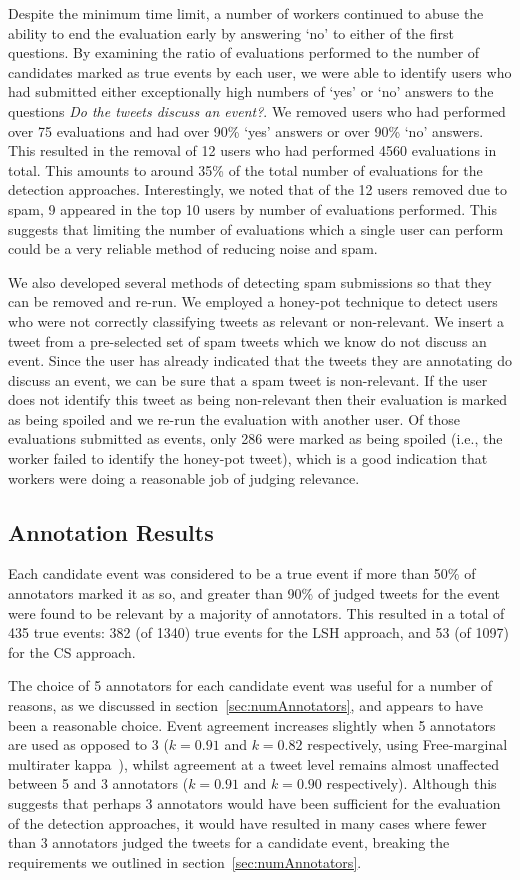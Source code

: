 Despite the minimum time limit, a number of workers continued to abuse the ability to end the evaluation early by answering `no' to either of the first questions.
By examining the ratio of evaluations performed to the number of candidates marked as true events by each user, we were able to identify users who had submitted either exceptionally high numbers of `yes' or `no' answers to the questions \emph{Do the tweets discuss an event?}.
We removed users who had performed over 75 evaluations and had over 90\% `yes' answers or over 90\% `no' answers.
This resulted in the removal of 12 users who had performed 4560 evaluations in total.
This amounts to around 35\% of the total number of evaluations for the detection approaches.
Interestingly, we noted that of the 12 users removed due to spam, 9 appeared in the top 10 users by number of evaluations performed.
This suggests that limiting the number of evaluations which a single user can perform could be a very reliable method of reducing noise and spam.

We also developed several methods of detecting spam submissions so that they can be removed and re-run.
We employed a honey-pot technique to detect users who were not correctly classifying tweets as relevant or non-relevant.
We insert a tweet from a pre-selected set of spam tweets which we know do not discuss an event.
Since the user has already indicated that the tweets they are annotating do discuss an event, we can be sure that a spam tweet is non-relevant.
If the user does not identify this tweet as being non-relevant then their evaluation is marked as being spoiled and we re-run the evaluation with another user.
Of those evaluations submitted as events, only 286 were marked as being spoiled (i.e., the worker failed to identify the honey-pot tweet), which is a good indication that workers were doing a reasonable job of judging relevance.

\subsection{Annotation Results}
Each candidate event was considered to be a true event if more than 50\% of annotators marked it as so, and greater than 90\% of judged tweets for the event were found to be relevant by a majority of annotators.
This resulted in a total of 435 true events: 382 (of 1340) true events for the LSH approach, and 53 (of 1097) for the CS approach.

The choice of 5 annotators for each candidate event was useful for a number of reasons, as we discussed in section~\ref{sec:numAnnotators}, and appears to have been a reasonable choice.
Event agreement increases slightly when 5 annotators are used as opposed to 3 (\(k = 0.91\) and \(k = 0.82\) respectively, using Free-marginal multirater kappa~\citep{Randolph}), whilst agreement at a tweet level remains almost unaffected between 5 and 3 annotators (\(k = 0.91\) and \(k = 0.90\) respectively).
Although this suggests that perhaps 3 annotators would have been sufficient for the evaluation of the detection approaches, it would have resulted in many cases where fewer than 3 annotators judged the tweets for a candidate event, breaking the requirements we outlined in section~\ref{sec:numAnnotators}.

